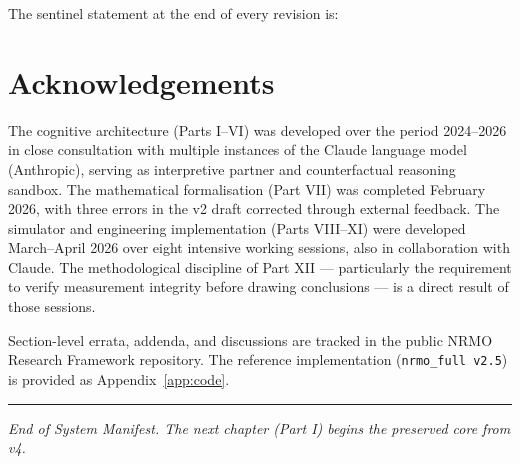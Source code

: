 \noindent
The sentinel statement at the end of every revision is:


\section*{Acknowledgements}

\noindent
The cognitive architecture (Parts I--VI) was developed over the period
2024--2026 in close consultation with multiple instances of the Claude
language model (Anthropic), serving as interpretive partner and
counterfactual reasoning sandbox. The mathematical formalisation (Part
VII) was completed February 2026, with three errors in the v2 draft
corrected through external feedback. The simulator and engineering
implementation (Parts VIII--XI) were developed March--April 2026 over
eight intensive working sessions, also in collaboration with Claude.
The methodological discipline of Part XII --- particularly the
requirement to verify measurement integrity before drawing conclusions
--- is a direct result of those sessions.

\noindent
Section-level errata, addenda, and discussions are tracked in the
public NRMO Research Framework repository. The reference
implementation (\texttt{nrmo\_full v2.5}) is provided as
Appendix~\ref{app:code}.

\vspace{1em}
\hrule
\vspace{1em}
\noindent
\textit{End of System Manifest. The next chapter (Part I) begins the
preserved core from v4.}

